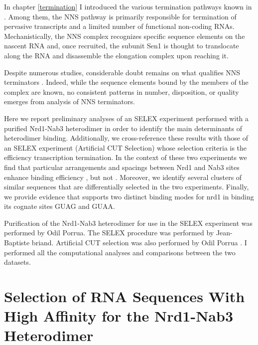 \newpage
\mbox{}


In chapter \ref{termination} I introduced the various termination pathways known in \cer{}. Among them, the NNS pathway is primarily responsible for termination of pervasive transcripts and a limited number of functional non-coding RNAs. Mechanistically, the NNS complex recognizes specific sequence elements on the nascent RNA and, once recruited, the subunit Sen1 is thought to translocate along the RNA and disassemble the elongation complex upon reaching it. 

Despite numerous studies, considerable doubt remains on what qualifies NNS terminators \invivo{}. Indeed, while the sequence elements bound by the members of the complex are known, no consistent patterns in number, disposition, or quality emerges from analysis of \invivo{} NNS terminators. 

Here we report preliminary analyses of an \invitro{} SELEX experiment performed with a purified Nrd1-Nab3 heterodimer in order to identify the main determinants of heterodimer binding. Additionally, we cross-reference these results with those of an \invivo{} SELEX experiment (Artificial CUT Selection) whose selection criteria is the efficiency transcription termination. In the context of these two experiments we find that particular arrangements and spacings between Nrd1 and Nab3 sites enhance binding efficiency \invitro{}, but not \invivo{}. Moreover, we identify several clusters of similar sequences that are differentially selected in the two experiments. Finally, we provide evidence that supports two distinct binding modes for nrd1 in binding its cognate sites GUAG and GUAA.

Purification of the Nrd1-Nab3 heterodimer for use in the SELEX experiment was performed by Odil Porrua. The \invitro{} SELEX procedure was performed by Jean-Baptiste briand. Artificial CUT selection was also performed by Odil Porrua \cite{porrua:2012:in}. I performed all the computational analyses and comparisons between the two datasets.



\singlespacing
\section{\Invitro{} Selection of RNA Sequences With High Affinity for the Nrd1-Nab3 Heterodimer}
\doublespacing

